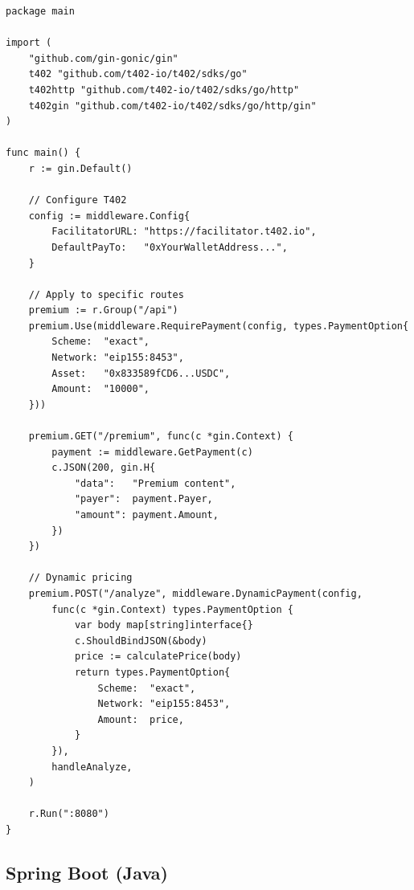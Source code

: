 \begin{lstlisting}[language=golang,caption={Complete Gin server setup}]
package main

import (
    "github.com/gin-gonic/gin"
    t402 "github.com/t402-io/t402/sdks/go"
    t402http "github.com/t402-io/t402/sdks/go/http"
    t402gin "github.com/t402-io/t402/sdks/go/http/gin"
)

func main() {
    r := gin.Default()

    // Configure T402
    config := middleware.Config{
        FacilitatorURL: "https://facilitator.t402.io",
        DefaultPayTo:   "0xYourWalletAddress...",
    }

    // Apply to specific routes
    premium := r.Group("/api")
    premium.Use(middleware.RequirePayment(config, types.PaymentOption{
        Scheme:  "exact",
        Network: "eip155:8453",
        Asset:   "0x833589fCD6...USDC",
        Amount:  "10000",
    }))

    premium.GET("/premium", func(c *gin.Context) {
        payment := middleware.GetPayment(c)
        c.JSON(200, gin.H{
            "data":   "Premium content",
            "payer":  payment.Payer,
            "amount": payment.Amount,
        })
    })

    // Dynamic pricing
    premium.POST("/analyze", middleware.DynamicPayment(config,
        func(c *gin.Context) types.PaymentOption {
            var body map[string]interface{}
            c.ShouldBindJSON(&body)
            price := calculatePrice(body)
            return types.PaymentOption{
                Scheme:  "exact",
                Network: "eip155:8453",
                Amount:  price,
            }
        }),
        handleAnalyze,
    )

    r.Run(":8080")
}
\end{lstlisting}

\subsection{Spring Boot (Java)}

